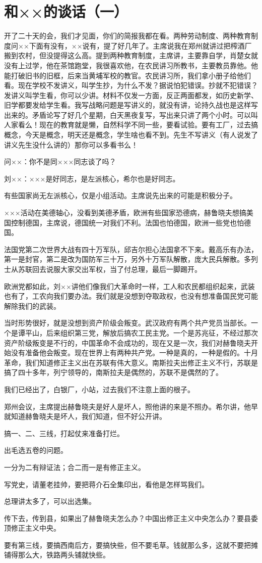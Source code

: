 \section[和××的谈话（一）（一九六四年六月八日）]{和××的谈话（一）}


开了二十天的会，我们才见面，你们的简报我都在看。两种劳动制度、两种教育制度问××下面有没有，××说有，提了好几年了。主席说我在郑州就讲过把榨酒厂搬到农村，但没提得这么高。提到两种教育制度，主席讲，主要靠自学，肖楚女就没有上过学，他在茶馆跑堂，我很喜欢他，在农民讲习所教书，主要教员靠他。他能打破旧书的旧框，后来当黄埔军校的教官。农民讲习所，我们拿小册子给他们看。现在学校不发讲义，叫学生抄，为什么不发？据说怕犯错误。抄就不犯错误？发讲义叫学生看，你可以少讲。材料不仅发一方面，反正两面都发，如历史新学、旧学都要发给学生看。我写战略问题是写讲义的，就没有讲，论持久战也是这样写出来的。矛盾论写了好几个星期，白天黑夜复写，写出来只讲了两个小时。可以叫人家看么！现在的教育就是懒，自然科学不同一些，要看试验。要有工厂，过去搞概念，今天是概念，明天还是概念，学生啥也看不到。先生不写讲义（有人说发了讲义先生没什么讲的）那你可以多看书么！

问××：你不是同×××同志谈了吗？

刘××：×××是好同志，是左派核心，希尔也是好同志。

有些国家尚无左派核心，仅是小组活动。主席说先出来的可能是积极分子。

×××活动在美德轴心，没看到美德矛盾，欧洲有些国家恐德病，赫鲁晓夫想搞美国控制德国，主席说，德国统一对我们不利。法国也怕德国，欧洲一些党也怕德国。

法国党第二次世界大战有四十万军队，邱吉尔担心法国拿不下来。戴高乐有办法，第一是封官，第二是改为国防军三十万，另外十万军队解散，庞大民兵解散。多列士从苏联回去说服大家交出军权，当了付总理，最后一脚踢开。

欧洲党都如此，刘××讲他们像我们大革命时一样，工人和农民都组织起来，武装也有了，工农向我们要办法。我们就是没想到夺取政权，也没有想准备国民党可能解除我们的武装。

当时形势很好，就是没想到资产阶级会叛变。武汉政府有两个共产党员当部长。一个是谭平山，后来组织第三党，解放后搞农工民主党。一个是苏兆征，不经过那次资产阶级叛变是不行的，中国革命不会成功的，现在又是一次，我们对赫鲁晓夫开始没有准备他会叛变。现在世界上有两种共产党。一种是真的，一种是假的。十月革命，我们知道修正主义出在苏联有伟大意义。南斯拉夫出修正主义不行，苏联是搞了四十多年，列宁领导的，南斯拉夫是偶然的，苏联不是偶然的了。

我们已经出了，白银厂，小站，过去我们不注意上面的根子。

郑州会议，主席提出赫鲁晓夫是好人是坏人，照他讲的来是不照办。希尔讲，他早就知道赫鲁晓夫是坏人，我们知道，但不好公开讲。

搞一、二、三线，打起仗来准备打烂。

出毛选五卷的问题。

一分为二有辩证法；合二而一是有修正主义。

写党史，请董老挂帅，要把蒋介石全集印出，看他是怎样骂我们。

总理讲太多了，可以出选集。

传下去，传到县，如果出了赫鲁晓夫怎么办？中国出修正主义中央怎么办？要县委顶修正主义中央。

要有第三线，要搞西南后方，要搞快些，但不要毛草。钱就那么多，这就不要把摊铺得那么大，铁路两头铺就快些。


